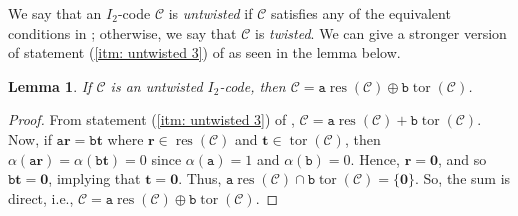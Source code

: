 \documentclass[12pt]{article}
\newtheorem{lemma}[lemma]{Lemma}
\theoremstyle{definition}
\theoremstyle{plain}
\newcommand{\Blue}[1]{{ \color{blue} #1}}
\begin{document}
We say that an $I_2$-code $\mathcal{C}$ is \textit{untwisted} if $\mathcal{C}$ satisfies any of the equivalent conditions in ; otherwise, we say that $\mathcal{C}$ is \textit{twisted}. We can give a stronger version of statement (\ref{itm: untwisted 3}) of  as seen in the lemma below.




\begin{lemma}  \label{thm:C as direct sum of resC and torC}
If $\mathcal{C}$ is an untwisted $I_2$-code, then $\mathcal{C} = \mathtt{a} \operatorname{res} (\mathcal{C}) \oplus \mathtt{b} \operatorname{tor} (\mathcal{C})$.
\end{lemma}

\begin{proof}
From statement (\ref{itm: untwisted 3}) of , $\mathcal{C} = \mathtt{a} \operatorname{res} (\mathcal{C}) + \mathtt{b} \operatorname{tor} (\mathcal{C})$. Now, if $\mathtt{a} \mathbf{r} = \mathtt{b} \mathbf{t}$ where $ \mathbf{r} \in \operatorname{res} (\mathcal{C})$ and $ \mathbf{t} \in\operatorname{tor}( \mathcal{C} )$, then $\alpha ( \mathtt{a} \mathbf{r} )  = \alpha ( \mathtt{b}  \mathbf{t} ) = 0$ since $\alpha (  \mathtt{a} ) = 1$ and $\alpha ( \mathtt{b} ) = 0$. Hence, $\mathbf{r} = \mathbf{0}$, and so $ \mathtt{b} \mathbf{t} = \mathbf{0}$, implying that $\mathbf{t} = \mathbf{0}$. Thus, $ \mathtt{a} \operatorname{res}(\mathcal{C}) \cap \mathtt{b} \operatorname{tor}(\mathcal{C}) = \{ \mathbf{0} \}$. So, the sum is direct, i.e., $\mathcal{C} = \mathtt{a} \operatorname{res} (\mathcal{C}) \oplus \mathtt{b} \operatorname{tor} (\mathcal{C})$.
\end{proof}
\end{document}
